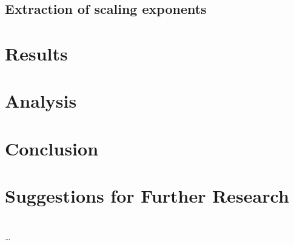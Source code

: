 \subsection{Extraction of scaling exponents}
\label{sec:extractCritExp}


\section{Results}
\label{sec:results}


\section{Analysis}
\label{sec:analysis}


\section{Conclusion}
\label{sec:conclusion}


\section{Suggestions for Further Research}
\label{sec:further_research}




\begin{acknowledgments}
\end{acknowledgments}


\appendix*

\section{}
\label{sec:}
\subsection{}
\dots

